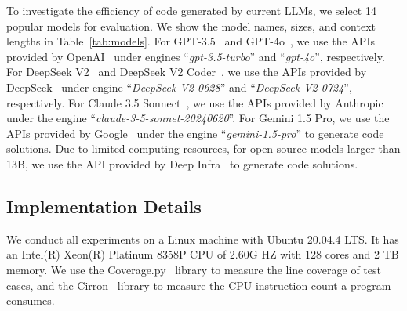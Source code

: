 To investigate the efficiency of code generated by current LLMs, we select 14 popular models for evaluation. We show the model names, sizes, and context lengths in Table~\ref{tab:models}. For GPT-3.5~\cite{chatgpt} and GPT-4o~\cite{gpt4o}, we use the APIs provided by OpenAI~\cite{openai} under engines ``\textit{gpt-3.5-turbo}'' and ``\textit{gpt-4o}'', respectively. For DeepSeek V2~\cite{deepseekv2} and DeepSeek V2 Coder~\cite{deepseekcoderv2}, we use the APIs provided by DeepSeek~\cite{deepseek} under engine ``\textit{DeepSeek-V2-0628}'' and ``\textit{DeepSeek-V2-0724}'', respectively. For Claude 3.5 Sonnect~\cite{claude}, we use the APIs provided by Anthropic~\cite{anthropic} under the engine ``\textit{claude-3-5-sonnet-20240620}''. For Gemini 1.5 Pro, we use the APIs provided by Google~\cite{googleapi} under the engine ``\textit{gemini-1.5-pro}'' to generate code solutions.   Due to limited computing resources, for open-source models larger than 13B, we use the API provided by Deep Infra~\cite{deepinfra} to generate code solutions. 





\subsection{Implementation Details}

We conduct all experiments on a Linux machine with Ubuntu 20.04.4 LTS. It has an Intel(R) Xeon(R) Platinum 8358P CPU of 2.60G HZ with 128 cores and 2 TB memory. We use the Coverage.py~\cite{coverage} library to measure the line coverage of test cases, and the Cirron~\cite{cirron} library to measure the CPU instruction count a program consumes. 